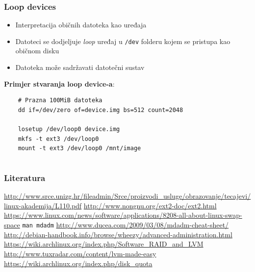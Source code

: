\documentclass[t]{beamer}
\begin{document}
\begin{frame}[fragile]
	\frametitle{Loop devices}
	\begin{itemize}
		\item Interpretacija običnih datoteka kao uređaja
		\item Datoteci se dodjeljuje \emph{loop} uređaj u \texttt{/dev} folderu kojem se pristupa kao običnom disku
	\end{itemize}
	\begin{itemize}
		\item Datoteka može sadržavati datotečni sustav
	\end{itemize}
	\vfill
	\textbf{Primjer stvaranja loop device-a}:
	\begin{verbatim}
	# Prazna 100MiB datoteka
	dd if=/dev/zero of=device.img bs=512 count=2048
	
	losetup /dev/loop0 device.img
	mkfs -t ext3 /dev/loop0
	mount -t ext3 /dev/loop0 /mnt/image
	\end{verbatim}
\end{frame}

\section*{}
\begin{frame}
	\frametitle{Literatura}
    \url{http://www.srce.unizg.hr/fileadmin/Srce/proizvodi_usluge/obrazovanje/tecajevi/linux-akademija/L110.pdf}
    \url{http://www.nongnu.org/ext2-doc/ext2.html}
    \url{https://www.linux.com/news/software/applications/8208-all-about-linux-swap-space}
	\texttt{man mdadm}
	\url{http://www.ducea.com/2009/03/08/mdadm-cheat-sheet/}
	\vfill
	\url{http://debian-handbook.info/browse/wheezy/advanced-administration.html}\\
	\url{https://wiki.archlinux.org/index.php/Software_RAID_and_LVM}\\
	\url{http://www.tuxradar.com/content/lvm-made-easy}
	\vfill
	\url{https://wiki.archlinux.org/index.php/disk_quota}
\end{frame}
\end{document}
